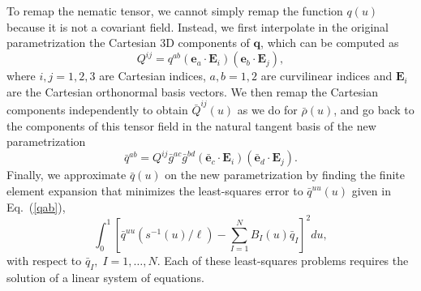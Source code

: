 {To remap the nematic tensor, we cannot simply remap the function $q(u)$ because it is not a covariant field. Instead, we first interpolate in the original parametrization the Cartesian 3D components of $\bm{q}$, which can be computed as 
\begin{equation}
Q^{ij} = q^{ab} (\bm{e}_a\cdot \bm{E}_i)(\bm{e}_b\cdot \bm{E}_j), 
\end{equation}
where $i,j = 1,2,3$ are Cartesian indices, $a,b = 1,2$ are curvilinear indices and $\bm{E}_i$ are the Cartesian orthonormal basis vectors. We then remap the Cartesian components independently to obtain $\bar{Q}^{ij}(u)$ as we do for $\bar{\rho}(u)$, and  go back to the components of this tensor field in the natural tangent basis of the new parametrization 
\begin{equation}\label{qab}
\bar{q}^{ab} = Q^{ij} \bar{g}^{ac}\bar{g}^{bd}(\bar{\bm{e}}_c\cdot \bm{E}_i)(\bar{\bm{e}}_d\cdot \bm{E}_j).
\end{equation}
Finally, we approximate $\bar{q}(u)$ on the new parametrization by finding the finite element expansion that minimizes the least-squares error to $\bar{q}^{uu}(u)$ given in Eq.~(\ref{qab}),\begin{equation}
\int_0^1 \left[\bar{q}^{uu}\left(s^{-1}(u)/\ell\right)  - \sum_{I=1}^N B_I(u) \bar{q}_I\right]^2 du,
\end{equation}
with respect to $\bar{q}_I, \; I = 1, \ldots, N$. Each of these least-squares problems requires the solution of a linear system of equations. 



}
